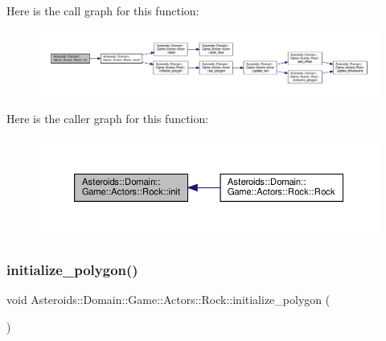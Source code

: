 Here is the call graph for this function\+:\nopagebreak
\begin{figure}[H]
\begin{center}
\leavevmode
\includegraphics[width=350pt]{classAsteroids_1_1Domain_1_1Game_1_1Actors_1_1Rock_a8bdb717103786b8a2e30ea29db791078_cgraph}
\end{center}
\end{figure}
Here is the caller graph for this function\+:\nopagebreak
\begin{figure}[H]
\begin{center}
\leavevmode
\includegraphics[width=350pt]{classAsteroids_1_1Domain_1_1Game_1_1Actors_1_1Rock_a8bdb717103786b8a2e30ea29db791078_icgraph}
\end{center}
\end{figure}
\mbox{\label{classAsteroids_1_1Domain_1_1Game_1_1Actors_1_1Rock_aa2a9c917715b56e4584f514c930c4690}} 
\subsubsection{\texorpdfstring{initialize\+\_\+polygon()}{initialize\_polygon()}}
{\footnotesize\ttfamily void Asteroids\+::\+Domain\+::\+Game\+::\+Actors\+::\+Rock\+::initialize\+\_\+polygon (\begin{DoxyParamCaption}{ }\end{DoxyParamCaption})\hspace{0.3cm}{\ttfamily [protected]}}

